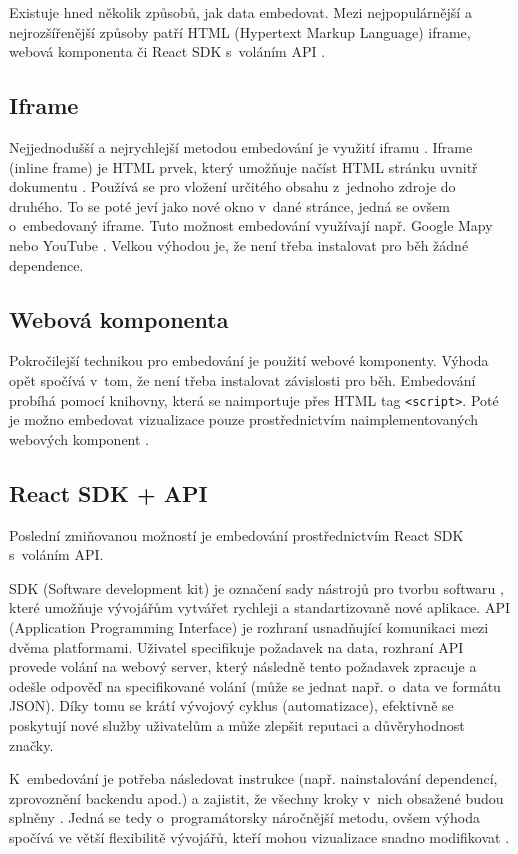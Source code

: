 \documentclass[czech, bc, kiv, he, iso690numb, viewonly]{fasthesis} %
\begin{document}
Existuje hned několik způsobů, jak data embedovat. Mezi nejpopulárnější a nejrozšířenější způsoby patří HTML (Hypertext Markup Language) iframe, webová komponenta či React SDK s~voláním API \cite{goodDataEmbedded}. 

\subsection{Iframe}
Nejjednodušší a nejrychlejší metodou embedování je využití iframu \cite{goodDataEmbedded}. Iframe (inline frame) je HTML prvek, který umožňuje načíst HTML stránku uvnitř dokumentu \cite{iFrameAdv}. Používá se pro vložení určitého obsahu z~jednoho zdroje do druhého. To se poté jeví jako nové okno v~dané stránce, jedná se ovšem o~embedovaný iframe. Tuto možnost embedování využívají např. Google Mapy nebo YouTube \cite{iFrameAdv}. Velkou výhodou je, že není třeba instalovat pro běh žádné dependence.

\subsection{Webová komponenta}
Pokročilejší technikou pro embedování je použití webové komponenty. Výhoda opět spočívá v~tom, že není třeba instalovat závislosti pro běh. Embedování probíhá pomocí knihovny, která se naimportuje přes HTML tag \texttt{<script>}. Poté je možno embedovat vizualizace pouze prostřednictvím naimplementovaných webových komponent \cite{webComp}.

\subsection{React SDK + API}
Poslední zmiňovanou možností je embedování prostřednictvím React SDK s~voláním API. 

SDK (Software development kit) je označení sady nástrojů pro tvorbu softwaru \cite{SDKvsAPI}, které umožňuje vývojářům vytvářet rychleji a standartizovaně nové aplikace. API 
(Application Programming Interface) je rozhraní usnadňující komunikaci mezi dvěma platformami. Uživatel specifikuje požadavek na data, rozhraní API provede volání na webový server, který
následně tento požadavek zpracuje a odešle odpověď na specifikované volání (může se jednat např. o~data ve formátu JSON). Díky tomu se krátí vývojový cyklus (automatizace), efektivně 
se poskytují nové služby uživatelům a může zlepšit reputaci a důvěryhodnost značky.

K~embedování je potřeba následovat instrukce (např. nainstalování dependencí, zprovoznění backendu apod.) a zajistit, že všechny kroky v~nich obsažené budou splněny \cite{reactSDKComp}. Jedná se tedy o~programátorsky náročnější metodu, ovšem výhoda spočívá ve větší flexibilitě vývojářů, kteří mohou vizualizace snadno modifikovat \cite{goodDataEmbedded}.
\end{document}
